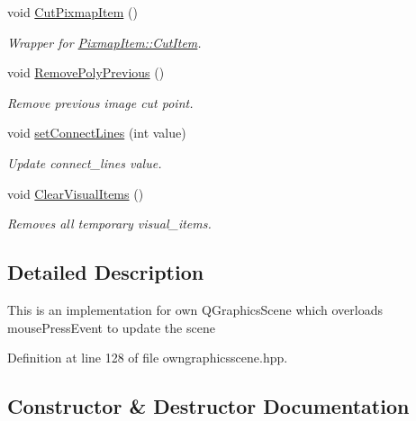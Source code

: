 \begin{DoxyCompactItemize}
void \mbox{\hyperlink{classOwnGraphicsScene_a7e3d97c27cca1df796b75cc4a99e24cd}{Cut\+Pixmap\+Item}} ()
\begin{DoxyCompactList}\small\item\em Wrapper for \mbox{\hyperlink{classPixmapItem_a4a742318dce01d018da2f4b01790c210}{Pixmap\+Item\+::\+Cut\+Item}}. \end{DoxyCompactList}\item 
void \mbox{\hyperlink{classOwnGraphicsScene_a4976a8e6f682612acd3e23b6c98bd8d8}{Remove\+Poly\+Previous}} ()
\begin{DoxyCompactList}\small\item\em Remove previous image cut point. \end{DoxyCompactList}\item 
void \mbox{\hyperlink{classOwnGraphicsScene_ad62254e1884fa4817ff1beaa3bc6c011}{set\+Connect\+Lines}} (int value)
\begin{DoxyCompactList}\small\item\em Update connect\+\_\+lines value. \end{DoxyCompactList}\item 
void \mbox{\hyperlink{classOwnGraphicsScene_a158c6430ca8e07642b693e37ec05119e}{Clear\+Visual\+Items}} ()
\begin{DoxyCompactList}\small\item\em Removes all temporary visual\+\_\+items. \end{DoxyCompactList}\end{DoxyCompactItemize}


\subsection{Detailed Description}
This is an implementation for own Q\+Graphics\+Scene which overloads mouse\+Press\+Event to update the scene 

Definition at line 128 of file owngraphicsscene.\+hpp.



\subsection{Constructor \& Destructor Documentation}
\mbox{\label{classOwnGraphicsScene_a242b82147a469314e4c7fb5af69c265f}} 
